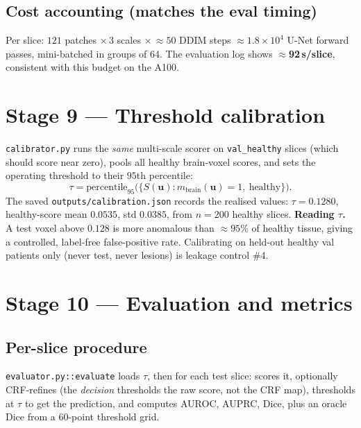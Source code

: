 \documentclass[11pt,a4paper]{article}
\newcommand{\code}[1]{\texttt{\small #1}}
\begin{document}
\subsection{Cost accounting (matches the eval timing)}
Per slice: $121$ patches $\times\,3$ scales $\times\,\approx50$ DDIM steps
$\approx 1.8\times10^4$ U-Net forward passes, mini-batched in groups of $64$.
The evaluation log shows $\approx$\textbf{92\,s/slice}, consistent with this
budget on the A100.

\section{Stage 9 — Threshold calibration}
\code{calibrator.py} runs the \emph{same} multi-scale scorer on
\code{val\_healthy} slices (which should score near zero), pools all healthy
brain-voxel scores, and sets the operating threshold to their $95$th percentile:
\begin{equation}
\tau=\mathrm{percentile}_{95}\big(\{S(\bm u): m_{\text{brain}}(\bm u)=1,\ \text{healthy}\}\big).
\end{equation}
The saved \code{outputs/calibration.json} records the realised values:
$\tau=\mathbf{0.1280}$, healthy-score mean $0.0535$, std $0.0385$, from
$n=200$ healthy slices. \textbf{Reading $\tau$.} A test voxel above $0.128$ is
more anomalous than $\approx95\%$ of healthy tissue, giving a controlled,
label-free false-positive rate. Calibrating on held-out healthy val patients
only (never test, never lesions) is leakage control \#4.

\section{Stage 10 — Evaluation and metrics}

\subsection{Per-slice procedure}
\code{evaluator.py::evaluate} loads $\tau$, then for each test slice: scores it,
optionally CRF-refines (the \emph{decision} thresholds the raw score, not the CRF
map), thresholds at $\tau$ to get the prediction, and computes AUROC, AUPRC, Dice,
plus an oracle Dice from a $60$-point threshold grid.
\end{document}
